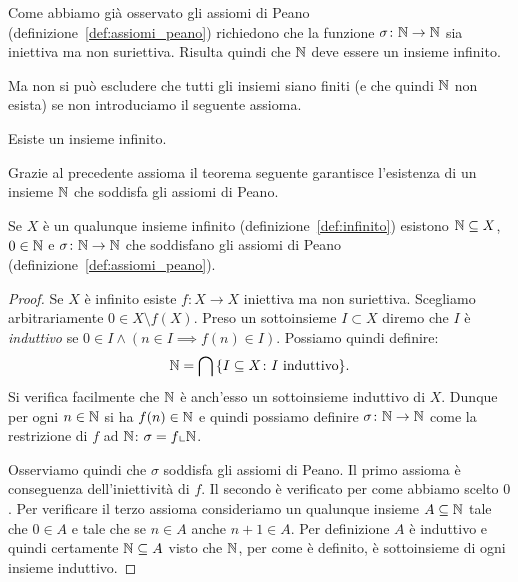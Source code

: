 Come abbiamo già osservato gli assiomi di Peano (definizione~\ref{def:assiomi_peano}) 
richiedono che la funzione $\sigma\colon {\mathbb N}\to{\mathbb N}$ sia iniettiva ma non suriettiva.
Risulta quindi che ${\mathbb N}$ deve essere un insieme infinito.

Ma non si può escludere che tutti gli insiemi siano finiti (e che quindi ${\mathbb N}$ non esista) 
se non introduciamo il seguente assioma.

\begin{axiom}[infinito]
  \label{axiom:infinito}%
  Esiste un insieme infinito. 
\end{axiom}

Grazie al precedente assioma il teorema seguente garantisce
l'esistenza di un insieme ${\mathbb N}$ che soddisfa gli assiomi di Peano.

\begin{theorem}
  \label{th:esistenza_naturali}%
Se $X$ è un qualunque insieme infinito (definizione~\ref{def:infinito})
esistono ${\mathbb N}\subseteq X$, $0\in {\mathbb N}$ e $\sigma\colon {\mathbb N}\to{\mathbb N}$ 
che soddisfano gli assiomi di Peano (definizione~\ref{def:assiomi_peano}).
\end{theorem}
%
\begin{proof}
Se $X$ è infinito esiste $f\colon X\to X$ iniettiva ma non suriettiva. 
Scegliamo arbitrariamente $0\in X\setminus f(X)$. 
Preso un sottoinsieme $I\subset X$ diremo che $I$ è \emph{induttivo}
%
%
se $0\in I \land (n\in I\implies f(n)\in I)$. 
Possiamo quindi definire:
\[
  {\mathbb N} = \bigcap {\left\{ I\subseteq X\colon \text{$I$ induttivo} \right\}}.
\]
Si verifica facilmente che ${\mathbb N}$ è anch'esso un sottoinsieme induttivo di $X$.
Dunque per ogni $n\in {\mathbb N}$ si ha $f(n)\in {\mathbb N}$ e quindi possiamo 
definire $\sigma\colon {\mathbb N}\to {\mathbb N}$ come la restrizione di $f$ 
ad ${\mathbb N}$: $\sigma=f\llcorner {\mathbb N}$.

Osserviamo quindi che $\sigma$ soddisfa gli assiomi di Peano.
Il primo assioma è conseguenza dell'iniettività di $f$.
Il secondo è verificato per come abbiamo scelto $0$.
Per verificare il terzo assioma consideriamo un qualunque insieme 
$A\subseteq {\mathbb N}$ tale che $0\in A$ e tale che se $n\in A$ anche $n+1\in A$.
Per definizione $A$ è induttivo e quindi certamente 
${\mathbb N}\subseteq A$ visto che ${\mathbb N}$, per come è definito,
è sottoinsieme di ogni insieme induttivo.
\end{proof}

